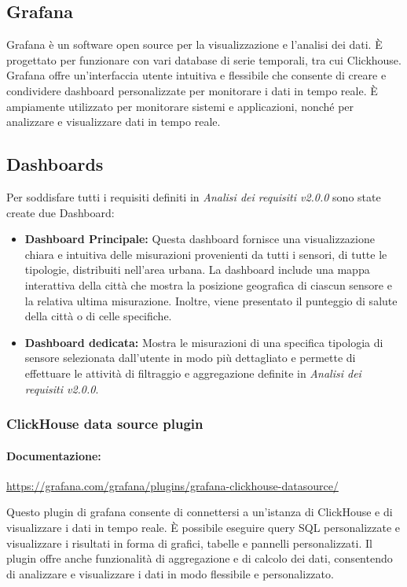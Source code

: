 \subsection{Grafana}
Grafana è un software open source per la visualizzazione e l'analisi dei dati. È progettato per funzionare con vari database di serie temporali, tra cui Clickhouse. Grafana offre un'interfaccia utente intuitiva e flessibile che consente di creare e condividere dashboard personalizzate per monitorare i dati in tempo reale. È ampiamente utilizzato per monitorare sistemi e applicazioni, nonché per analizzare e visualizzare dati in tempo reale.

\subsection{Dashboards}
Per soddisfare tutti i requisiti definiti in \textit{Analisi dei requisiti v2.0.0} sono state create due Dashboard:
\begin{itemize}
    \item \textbf{Dashboard Principale:} Questa dashboard fornisce una visualizzazione chiara e intuitiva delle misurazioni provenienti da tutti i sensori, di tutte le tipologie, distribuiti nell'area urbana. La dashboard include una mappa interattiva della città che mostra la posizione geografica di ciascun sensore e la relativa ultima misurazione. Inoltre, viene presentato il punteggio di salute della città o di celle specifiche.
    \item \textbf{Dashboard dedicata:} Mostra le misurazioni di una specifica tipologia di sensore selezionata dall'utente in modo più dettagliato e permette di effettuare le attività di filtraggio e aggregazione definite in \textit{Analisi dei requisiti v2.0.0}.
\end{itemize}




\subsubsection{ClickHouse data source plugin} \label{sec:click_plugin}
\paragraph{Documentazione:} \href{https://grafana.com/grafana/plugins/grafana-clickhouse-datasource/}{https://grafana.com/grafana/plugins/grafana-clickhouse-datasource/}

Questo plugin di grafana consente di connettersi a un'istanza di ClickHouse e di visualizzare i dati in tempo reale. È possibile eseguire query SQL personalizzate e visualizzare i risultati in forma di grafici, tabelle e pannelli personalizzati. Il plugin offre anche funzionalità di aggregazione e di calcolo dei dati, consentendo di analizzare e visualizzare i dati in modo flessibile e personalizzato.

